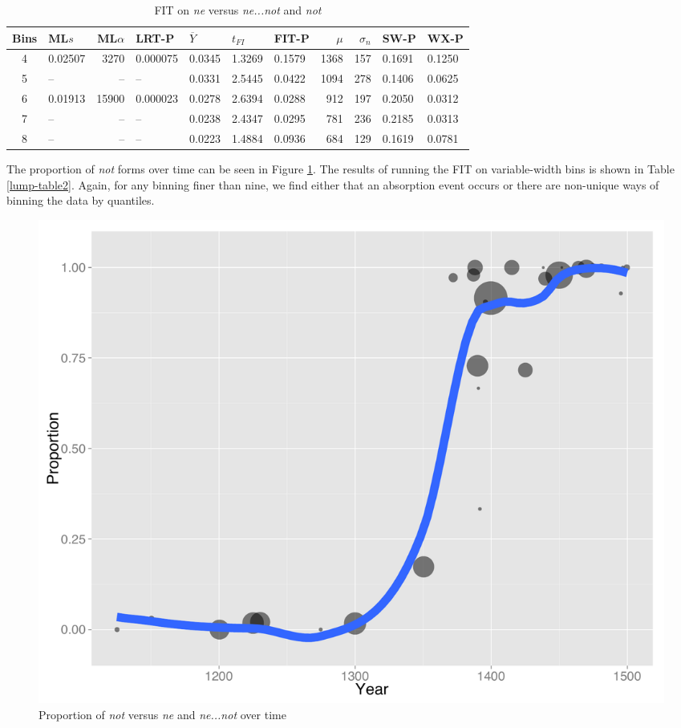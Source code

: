 \begin{table}[ht]
\centering
\begin{tabular}{c  l  r  l  l  l  l   r  r  l l }
  \hline
Bins & ML$s$ & ML$\alpha$ & LRT-P & $\overline{Y}$ & $t_{FI}$ & FIT-P & $\mu$ & $\sigma_n$ & SW-P & WX-P \\ 
  \hline
  4 & 0.02507 & 3270 & 0.000075 & 0.0345 & 1.3269 & 0.1579 & 1368 & 157 & 0.1691 & 0.1250 \\  
  5 & -- & -- & -- & 0.0331 & 2.5445 & 0.0422 & 1094 & 278 & 0.1406 & 0.0625 \\  
  6 & 0.01913 & 15900 & 0.000023 & 0.0278 & 2.6394 & 0.0288 & 912 & 197 & 0.2050 & 0.0312 \\ 
  7 & -- & -- & -- & 0.0238 & 2.4347 & 0.0295 & 781 & 236 & 0.2185 & 0.0313 \\
  8 & -- & -- & -- & 0.0223 & 1.4884 & 0.0936 & 684 & 129 & 0.1619 & 0.0781 \\ 
   \hline
\end{tabular}
\caption{FIT on \textit{\color{red}  ne} versus \textit{\color{blue} ne...not} and \textit{\color{green} not} }
\label{lump-table1}
\end{table}


The proportion of \textit{\color{green} not} forms over time can be seen in Figure \ref{lump-plot2}. The results of running the FIT on variable-width bins is shown in Table \ref{lump-table2}. Again, for any binning finer than nine, we find either that an absorption event occurs or there are non-unique ways of binning the data by quantiles.


\begin{figure}
\centering
     \includegraphics[width=\textwidth]{lump-plot2.pdf}
\caption{Proportion of \textit{\color{green} not} versus \textit{\color{red}  ne} and \textit{\color{blue} ne...not} over time}
\label{lump-plot2}
\end{figure}


